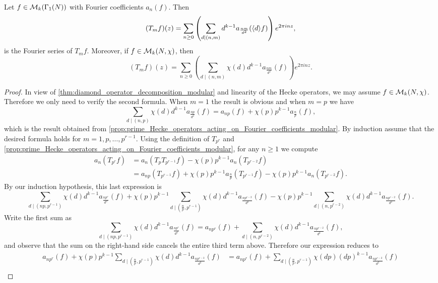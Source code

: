       \begin{proposition}\label{prop:general_Hecke_operators_acting_on_Fourier_coefficients_modular}
        Let $f \in \mathcal{M}_{k}(\Gamma_{1}(N))$ with Fourier coefficients $a_{n}(f)$. Then
        \[
          (T_{m}f)(z) = \sum_{n \ge 0}\left(\sum_{d \mid (n,m)}d^{k-1}a_{\frac{nm}{d^{2}}}(\langle d\rangle f)\right)e^{2\pi inz},
        \]
        is the Fourier series of $T_{m}f$. Moreover, if $f \in \mathcal{M}_{k}(N,\chi)$, then
        \[
          (T_{m}f)(z) = \sum_{n \ge 0}\left(\sum_{d \mid (n,m)}\chi(d)d^{k-1}a_{\frac{nm}{d^{2}}}(f)\right)e^{2\pi inz}.
        \]
      \end{proposition}
      \begin{proof}
        In view of \cref{thm:diamond_operator_decomposition_modular} and linearity of the Hecke operators, we may assume $f \in \mathcal{M}_{k}(N,\chi)$. Therefore we only need to verify the second formula. When $m = 1$ the result is obvious and when $m = p$ we have
        \[
          \sum_{d \mid (n,p)}\chi(d)d^{k-1}a_{\frac{np}{d^{2}}}(f) = a_{np}(f)+\chi(p)p^{k-1}a_{\frac{n}{p}}(f),
        \]
        which is the result obtained from \cref{prop:prime_Hecke_operators_acting_on_Fourier_coefficients_modular}. By induction assume that the desired formula holds for $m = 1,p,\ldots,p^{r-1}$. Using the definition of $T_{p^{r}}$ and \cref{prop:prime_Hecke_operators_acting_on_Fourier_coefficients_modular}, for any $n \ge 1$ we compute
        \begin{align*}
          a_{n}(T_{p^{r}}f) &= a_{n}(T_{p}T_{p^{r-1}}f)-\chi(p)p^{k-1}a_{n}(T_{p^{r-2}}f) \\
          &= a_{np}(T_{p^{r-1}}f)+\chi(p)p^{k-1}a_{\frac{n}{p}}(T_{p^{r-1}}f)-\chi(p)p^{k-1}a_{n}(T_{p^{r-2}}f).
        \end{align*}
        By our induction hypothesis, this last expression is
        \[
          \sum_{d \mid (np,p^{r-1})}\chi(d)d^{k-1}a_{\frac{np^{r}}{d^{2}}}(f)+\chi(p)p^{k-1}\sum_{d \mid \left(\frac{n}{p},p^{r-1}\right)}\chi(d)d^{k-1}a_{\frac{np^{r-2}}{d^{2}}}(f)-\chi(p)p^{k-1}\sum_{d \mid (n,p^{r-2})}\chi(d)d^{k-1}a_{\frac{np^{r-2}}{d^{2}}}(f).
        \]
        Write the first sum as
        \[
          \sum_{d \mid (np,p^{r-1})}\chi(d)d^{k-1}a_{\frac{np^{r}}{d^{2}}}(f) = a_{np^{r}}(f)+\sum_{d \mid (n,p^{r-2})}\chi(d)d^{k-1}a_{\frac{np^{r-2}}{d^{2}}}(f),
        \]
        and observe that the sum on the right-hand side cancels the entire third term above. Therefore our expression reduces to
        \begin{align*}
          a_{np^{r}}(f)+\chi(p)p^{k-1}\sum_{d \mid \left(\frac{n}{p},p^{r-1}\right)}\chi(d)d^{k-1}a_{\frac{np^{r-2}}{d^{2}}}(f) &= a_{np^{r}}(f)+\sum_{d \mid \left(\frac{n}{p},p^{r-1}\right)}\chi(dp)(dp)^{k-1}a_{\frac{np^{r-2}}{d^{2}}}(f) \\

\end{align*}
\end{proof}
